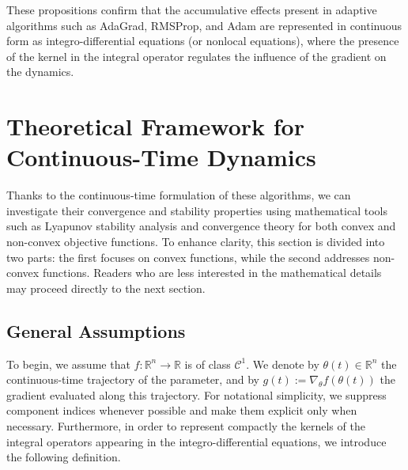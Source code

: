 \documentclass{article} %
\begin{document}
These propositions confirm that the accumulative effects present in adaptive algorithms such as AdaGrad, RMSProp, and Adam are represented in continuous form as integro-differential equations (or nonlocal equations), where the presence of the kernel in the integral operator regulates the influence of the gradient on the dynamics.

\section{Theoretical Framework for Continuous-Time Dynamics}\label{Section:Maths}

Thanks to the continuous-time formulation of these algorithms, we can investigate their convergence and stability properties using mathematical tools such as Lyapunov stability analysis and convergence theory for both convex and non-convex objective functions. To enhance clarity, this section is divided into two parts: the first focuses on convex functions, while the second addresses non-convex functions. Readers who are less interested in the mathematical details may proceed directly to the next section.

\subsection{General Assumptions}
To begin, we assume that \( f : \mathbb{R}^n \to \mathbb{R} \) is of class \( \mathcal{C}^1 \). We denote by \( \theta(t) \in \mathbb{R}^n \) the continuous-time trajectory of the parameter,  and by \( g(t) := \nabla_\theta f(\theta(t)) \) the gradient evaluated along this trajectory. For notational simplicity, we suppress component indices whenever possible and make them explicit only when necessary. Furthermore, in order to represent compactly the kernels of the integral operators appearing in the integro-differential equations, we introduce the following definition.
\end{document}
